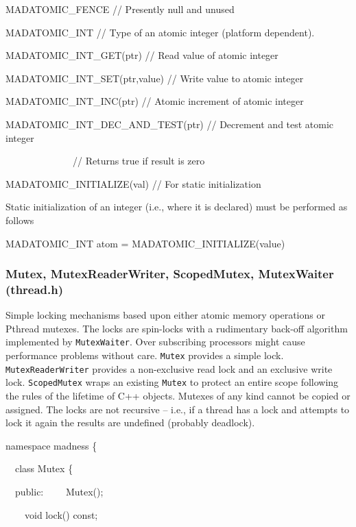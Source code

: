 \documentclass[letterpaper]{article}
\begin{document}
{\ttfamily
MADATOMIC\_FENCE // Presently null and unused}

{\ttfamily
MADATOMIC\_INT // Type of an atomic integer (platform dependent).}

{\ttfamily
MADATOMIC\_INT\_GET(ptr) // Read value of atomic integer}

{\ttfamily
MADATOMIC\_INT\_SET(ptr,value) // Write value to atomic integer}

{\ttfamily
MADATOMIC\_INT\_INC(ptr) // Atomic increment of atomic integer}

{\ttfamily
MADATOMIC\_INT\_DEC\_AND\_TEST(ptr) // Decrement and test atomic integer}

{\ttfamily
\ \ \ \ \ \ \ \ \ \ \ \  \ \ // Returns true if result is zero}

{\ttfamily
MADATOMIC\_INITIALIZE(val) // For static initialization}


\bigskip

Static initialization of an integer (i.e., where it is declared) must be performed as follows

{\ttfamily
MADATOMIC\_INT atom = MADATOMIC\_INITIALIZE(value)}


\bigskip

\subsubsection{Mutex, MutexReaderWriter, ScopedMutex, MutexWaiter (thread.h)}
Simple locking mechanisms based upon either atomic memory operations or Pthread mutexes. The locks are spin-locks with a
rudimentary back-off algorithm implemented by \texttt{MutexWaiter}. Over subscribing processors might cause performance
problems without care. \texttt{Mutex} provides a simple lock. \texttt{MutexReaderWriter} provides a non-exclusive read
lock and an exclusive write lock. \texttt{ScopedMutex} wraps an existing \texttt{Mutex} to protect an entire scope
following the rules of the lifetime of C++ objects. Mutexes of any kind cannot be copied or assigned. The locks are not
recursive -- i.e., if a thread has a lock and attempts to lock it again the results are undefined (probably deadlock).

{\ttfamily
namespace madness \{}

{\ttfamily
\ \ class Mutex \{}

{\ttfamily
\ \ public:\newline
\ \ \ \ Mutex();}

{\ttfamily
\ \ \ \ void lock() const;}
\end{document}
